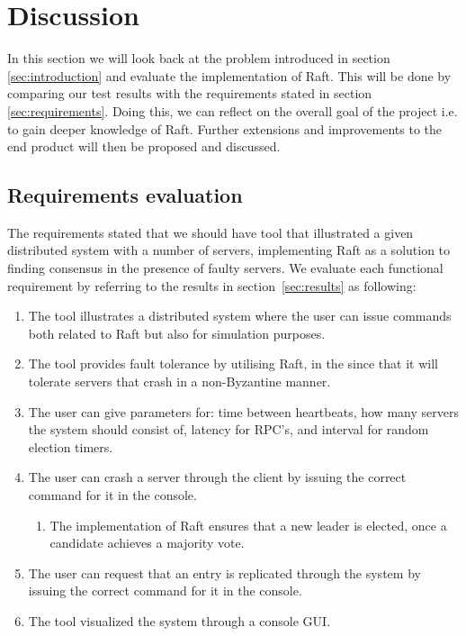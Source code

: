 \section{Discussion} %
\label{sec:discussion}
In this section we will look back at the problem introduced in section \ref{sec:introduction} and evaluate the implementation of Raft. This will be done by comparing our test results with the requirements stated in section \ref{sec:requirements}. Doing this, we can reflect on the overall goal of the project i.e. to gain deeper knowledge of Raft. Further extensions and improvements to the end product will then be proposed and discussed.

\subsection{Requirements evaluation}
The requirements stated that we should have tool that illustrated a given distributed system with a number of servers, implementing Raft as a solution to finding consensus in the presence of faulty servers. We evaluate each functional requirement by referring to the results in section~\ref{sec:results} as following:

\begin{enumerate}
\item The tool illustrates a distributed system where the user can issue commands both related to Raft but also for simulation purposes.
\item The tool provides fault tolerance by utilising Raft, in the since that it will tolerate servers that crash in a non-Byzantine manner.
\item The user can give parameters for: time between heartbeats, how many servers the system should consist of, latency for RPC's, and interval for random election timers.
\item The user can crash a server through the client by issuing the correct command for it in the console.
    \begin{enumerate}
    \item The implementation of Raft ensures that a new leader is elected, once a candidate achieves a majority vote.
    \end{enumerate}
\item The user can request that an entry is replicated through the system by issuing the correct command for it in the console.
\item The tool visualized the system through a console GUI.
\end{enumerate}


